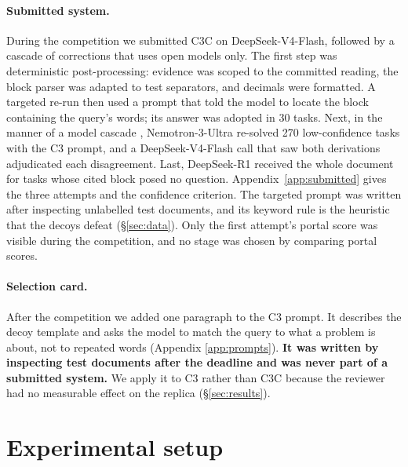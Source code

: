 \documentclass[11pt]{article}%
\begin{document}
\paragraph{Submitted system.} During the competition we submitted \textsc{C3C}
on DeepSeek-V4-Flash, followed by a cascade of corrections that uses open
models only. The first step was deterministic post-processing: evidence was
scoped to the committed reading, the block parser was adapted to test
separators, and decimals were formatted. A targeted re-run then used a prompt
that told the model to locate the block containing the query's words; its
answer was adopted in 30 tasks. Next, in the manner of a model cascade \citep{chen2023frugalgpt}, Nemotron-3-Ultra \citep{nvidia2026nemotron3ultra} re-solved 270
low-confidence tasks with the \textsc{C3} prompt, and a DeepSeek-V4-Flash call
that saw both derivations adjudicated each disagreement. Last, DeepSeek-R1 \citep{deepseek2025r1} received the whole document for tasks whose cited block posed no question.
Appendix~\ref{app:submitted} gives the three attempts and the confidence
criterion. The targeted prompt was written after inspecting unlabelled test
documents, and its keyword rule is the heuristic that the decoys defeat
(\S\ref{sec:data}). Only the first attempt's portal score was visible during
the competition, and no stage was chosen by comparing portal scores.

\paragraph{Selection card.} After the competition we added one paragraph to
the \textsc{C3} prompt. It describes the decoy template and asks the model to
match the query to what a problem is about, not to repeated words (Appendix
\ref{app:prompts}). \textbf{It was written by inspecting test documents after
the deadline and was never part of a submitted system.} We apply it to
\textsc{C3} rather than \textsc{C3C} because the reviewer had no measurable
effect on the replica (\S\ref{sec:results}).

\section{Experimental setup}
\label{sec:setup}
\end{document}
